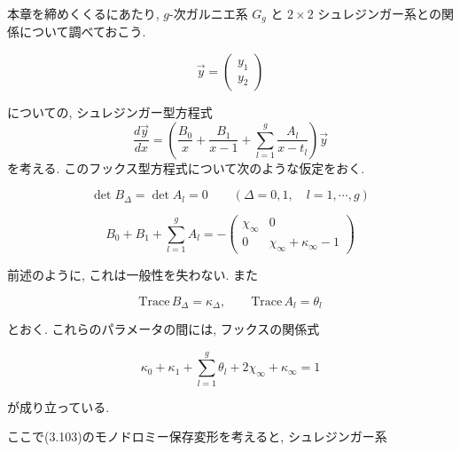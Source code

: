 \begin{story}
本章を締めくくるにあたり, $g$-次ガルニエ系 $G_g$ と $2 \times 2$ シュレジンガー系との関係について調べておこう.

$$
\vec{y} = \begin{pmatrix} y_1 \\ y_2 \end{pmatrix}
$$

についての, シュレジンガー型方程式
\begin{equation} \tag{3.103}
    \frac{d\vec{y}}{dx} = \left( \frac{B_0}{x} + \frac{B_1}{x-1} + \sum_{l=1}^g \frac{A_l}{x-t_l} \right) \vec{y}
\end{equation}
を考える. このフックス型方程式について次のような仮定をおく.

$$
\det B_\Delta = \det A_l = 0 \qquad (\Delta = 0, 1, \quad l = 1, \cdots, g)
$$

\begin{equation} \tag{3.104}
    B_0 + B_1 + \sum_{l=1}^g A_l = - \begin{pmatrix} \chi_\infty & 0 \\ 0 & \chi_\infty + \kappa_\infty - 1 \end{pmatrix}
\end{equation}

前述のように, これは一般性を失わない. また

$$
\mathrm{Trace}\, B_\Delta = \kappa_\Delta, \qquad \mathrm{Trace}\, A_l = \theta_l
$$

とおく. これらのパラメータの間には, フックスの関係式

$$
\kappa_0 + \kappa_1 + \sum_{l=1}^g \theta_l + 2\chi_\infty + \kappa_\infty = 1
$$

が成り立っている.

ここで(3.103)のモノドロミー保存変形を考えると, シュレジンガー系
\end{story}